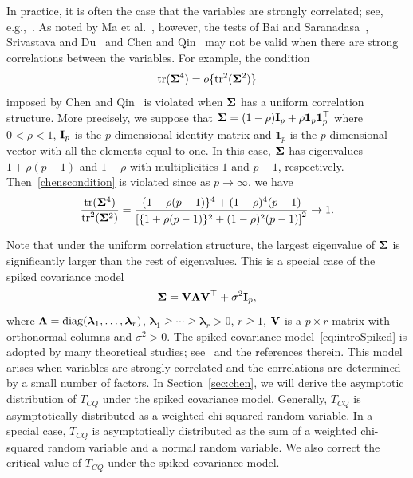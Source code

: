\documentclass[times,sort&compress,3p]{elsarticle}
\newcommand{\mytr}{ {\rm tr} }
\newcommand{\mydiag}{ {\rm diag} }
\newcommand{\bfsym}[1]{\ensuremath{\boldsymbol{#1}}}
\def\blambda {\bfsym {\lambda}}        \def\bLambda {\bfsym {\Lambda}}
\theoremstyle{plain}
\theoremstyle{definition}
\theoremstyle{remark}
\begin{document}
In practice, it is often the case that the variables are strongly correlated;
see, e.g.,~\cite{Chen2011A,Ma2015A,Thulin2014A}.
As noted by Ma {\rm et al.}~\cite{Ma2015A}, however, the tests of Bai and Saranadasa~\cite{Bai1996Efiect}, Srivastava and Du~\cite{Srivastava2008A} and Chen and Qin~\cite{Chen2010A} may not be valid when there are strong correlations between the variables.
For example, the condition 
\begin{equation}\label{chenscondition}
    \mathrm{tr}(\bSigma^4)=o\{\mathrm{tr}^2(\bSigma^2)\}
\end{equation}
imposed by Chen and Qin~\cite{Chen2010A} is violated when $\bSigma$ has a uniform correlation structure.
More precisely, we suppose that
$\bSigma=(1-\rho)\BI_p+\rho\textbf{1}_p \textbf{1}_p^\top $ where $0<\rho<1$, $\mathbf{I}_p$ is the $p$-dimensional identity matrix and $\bm{1}_p$ is the $p$-dimensional vector with all the elements equal to one.
In this case, $\bSigma$ has eigenvalues $1+\rho(p-1) $ and $1-\rho$ with multiplicities $1$ and $p-1$, respectively. Then~\eqref{chenscondition} is violated since as $p\to \infty$, we have
$$
\frac{\mytr (\bSigma^4)}{\mytr^2(\bSigma^2)}=\frac{\{1+\rho(p-1)\}^4 + (1-\rho)^4 (p-1)}{\left[ \{1+\rho(p-1)\}^2+(1-\rho)^2 (p-1) \right]^2}\to 1.
$$

  Note that under the uniform correlation structure, the largest eigenvalue of $\bSigma$ is significantly larger than the rest of eigenvalues.
  This is a special case of the spiked covariance model
 \begin{equation}\label{eq:introSpiked}
 \bSigma =\BV\bLambda \BV^\top  +\sigma^2 \BI_p,
 \end{equation}
 where $\bLambda=\mydiag(\blambda_1,\ldots,\blambda_r)$, $\blambda_1\geq \cdots\geq \blambda_r>0$, $r\geq 1$, $\mathbf{V}$ is a $p\times r$ matrix with orthonormal columns and $\sigma^2>0$.
The spiked covariance model~\eqref{eq:introSpiked} is adopted by many theoretical studies; see~\cite{Birnbaum2013,Cai2012Sparse,Passemier2015} and the references therein.
This model arises when variables are strongly correlated and the correlations are determined by a small number of factors.
 In Section~\ref{sec:chen}, we will derive the asymptotic distribution of $T_{CQ}$ under the spiked covariance model. 
Generally, $T_{CQ}$ is asymptotically distributed as a weighted chi-squared random variable.
In a special case, $T_{CQ}$ is asymptotically distributed as the sum of a weighted chi-squared random variable and a normal random variable. 
We also correct the critical value of $T_{CQ}$ under the spiked covariance model.
\end{document}
